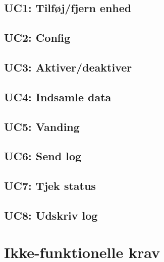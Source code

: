 %


\subsection{UC1: Tilføj/fjern enhed}



\subsection{UC2: Config}



\subsection{UC3: Aktiver/deaktiver}



\subsection{UC4: Indsamle data}



\subsection{UC5: Vanding}



\subsection{UC6: Send log}



\subsection{UC7: Tjek status}


\subsection{UC8: Udskriv log}



\section{Ikke-funktionelle krav}

